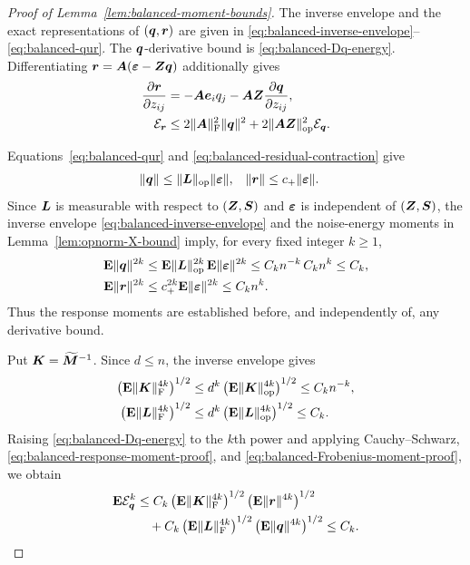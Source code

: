 \documentclass{article}
\theoremstyle{plain} %
\theoremstyle{definition} %
\theoremstyle{definition} %
\begin{document}
\begin{proof}[Proof of Lemma~\ref{lem:balanced-moment-bounds}]
The inverse envelope and the exact representations of $(\boldsymbol{q},\boldsymbol{r})$ are given
in \eqref{eq:balanced-inverse-envelope}--\eqref{eq:balanced-qur}.  The
$\boldsymbol{q}$-derivative bound is \eqref{eq:balanced-Dq-energy}.
Differentiating $\boldsymbol{r}=\boldsymbol{A}({\boldsymbol{\varepsilon} }-\boldsymbol{Z}\boldsymbol{q})$ additionally gives
\begin{align}
    \pdv{\boldsymbol{r}}{z_{ij}}
    &=-\boldsymbol{A}\boldsymbol{e}_i q_j-\boldsymbol{A}\boldsymbol{Z}\pdv{\boldsymbol{q}}{z_{ij}},\notag\\
    {\mathcal E}_{\boldsymbol{r}}
    &\leq
      2\lVert\boldsymbol{A}\rVert_{\rm F}^2\lVert\boldsymbol{q}\rVert^2
      +2\lVert\boldsymbol{A}\boldsymbol{Z}\rVert_{\rm op}^2{\mathcal E}_{\boldsymbol{q}}.
    \label{eq:balanced-Dr-energy}
\end{align}

Equations~\eqref{eq:balanced-qur} and
\eqref{eq:balanced-residual-contraction} give
\begin{align*}
    \lVert\boldsymbol{q}\rVert
    &\leq\lVert\boldsymbol{L}\rVert_{\rm op}\lVert{\boldsymbol{\varepsilon} }\rVert,
    &
    \lVert\boldsymbol{r}\rVert
    &\leq c_+\lVert{\boldsymbol{\varepsilon} }\rVert.
\end{align*}
Since $\boldsymbol{L}$ is measurable with respect to $(\boldsymbol{Z},\boldsymbol{S})$ and ${\boldsymbol{\varepsilon} }$ is
independent of $(\boldsymbol{Z},\boldsymbol{S})$, the inverse envelope
\eqref{eq:balanced-inverse-envelope} and the noise-energy moments in
Lemma~\ref{lem:opnorm-X-bound} imply, for every fixed integer $k\geq1$,
\begin{align}
    {\mathbf{E}}\lVert\boldsymbol{q}\rVert^{2k}
    &\leq {\mathbf{E}}\lVert\boldsymbol{L}\rVert_{\rm op}^{2k}\,
       {\mathbf{E}}\lVert{\boldsymbol{\varepsilon} }\rVert^{2k}
     \leq C_kn^{-k}\,C_kn^k
     \leq C_k,\notag\\
    {\mathbf{E}}\lVert\boldsymbol{r}\rVert^{2k}
    &\leq c_+^{2k}{\mathbf{E}}\lVert{\boldsymbol{\varepsilon} }\rVert^{2k}
     \leq C_kn^k.
    \label{eq:balanced-response-moment-proof}
\end{align}
Thus the response moments are established before, and independently of, any
derivative bound.

Put $\boldsymbol{K}=\widetilde{\boldsymbol{M}}^{-1}$.  Since $d\leq n$, the inverse envelope gives
\begin{align}
    \left({\mathbf{E}}\lVert\boldsymbol{K}\rVert_{\rm F}^{4k}\right)^{1/2}
    &\leq d^k
       \left({\mathbf{E}}\lVert\boldsymbol{K}\rVert_{\rm op}^{4k}\right)^{1/2}
      \leq C_kn^{-k},\notag\\
    \left({\mathbf{E}}\lVert\boldsymbol{L}\rVert_{\rm F}^{4k}\right)^{1/2}
    &\leq d^k
       \left({\mathbf{E}}\lVert\boldsymbol{L}\rVert_{\rm op}^{4k}\right)^{1/2}
      \leq C_k.
    \label{eq:balanced-Frobenius-moment-proof}
\end{align}
Raising \eqref{eq:balanced-Dq-energy} to the $k$th power and applying
Cauchy--Schwarz, \eqref{eq:balanced-response-moment-proof}, and
\eqref{eq:balanced-Frobenius-moment-proof}, we obtain
\begin{align}
    {\mathbf{E}}{\mathcal E}_{\boldsymbol{q}}^{k}
    &\leq C_k
       \left({\mathbf{E}}\lVert\boldsymbol{K}\rVert_{\rm F}^{4k}\right)^{1/2}
       \left({\mathbf{E}}\lVert\boldsymbol{r}\rVert^{4k}\right)^{1/2}\notag\\
    &\quad+C_k
       \left({\mathbf{E}}\lVert\boldsymbol{L}\rVert_{\rm F}^{4k}\right)^{1/2}
       \left({\mathbf{E}}\lVert\boldsymbol{q}\rVert^{4k}\right)^{1/2}
     \leq C_k.
    \label{eq:balanced-Dq-all-moments}
\end{align}


\end{proof}
\end{document}
